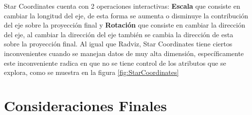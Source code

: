 Star Coordinates cuenta con 2 operaciones interactivas: \textbf{Escala} que consiste en cambiar la longitud del eje, de esta forma se aumenta o disminuye la contribución del eje sobre la proyección final y \textbf{Rotación} que consiste en cambiar la dirección del eje, al cambiar la dirección del eje también se cambia la dirección de esta sobre la proyección final. 
Al igual que Radviz, Star Coordinates tiene ciertos inconvenientes cuando se manejan datos de muy alta dimensión, específicamente este inconveniente radica en que no se tiene control de los atributos que se explora, como se muestra en la figura \ref{fig:StarCoordinates} 

\section{Consideraciones Finales}
